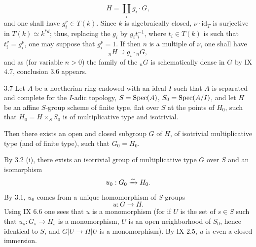 \[
H=\coprod_i g_i\cdot G,
\]
and one shall have $g_i^\nu\in T(k)$. Since $k$ is algebraically closed, $\nu\cdot\mathrm{id}_T$ is surjective in $T(k)\simeq k^{*d}$; thus, replacing the $g_i$ by $g_it_i^{-1}$, where $t_i\in T(k)$ is such that $t_i^\nu=g_i^\nu$, one may suppose that $g_i^\nu=1$. If then $n$ is a multiple of $\nu$, one shall have
\[
{}_nH\supseteq g_i\cdot{}_nG,
\]
and as (for variable $n>0$) the family of the ${}_nG$ is schematically dense in $G$ by IX 4.7, conclusion 3.6 appears.
\begin{theorem}{3.7}\label{X.3.7}
Let $A$ be a noetherian ring endowed with an ideal $I$ such that $A$ is separated and complete for the $I$-adic topology, $S=\operatorname{Spec}(A)$, $S_0=\operatorname{Spec}(A/I)$, and let $H$ be an affine $S$-group scheme of finite type, flat over $S$ at the points of $H_0$, such that $H_0=H\times_S S_0$ is of multiplicative type and isotrivial.

Then there exists an open and closed subgroup $G$ of $H$, of isotrivial multiplicative type (and of finite type), such that $G_0=H_0$.
\end{theorem}
By 3.2 (i), there exists an isotrivial group of multiplicative type $G$ over $S$ and an isomorphism
\[
u_0:G_0\xrightarrow{\sim} H_0.
\]
By 3.1, $u_0$ comes from a unique homomorphism of $S$-groups
\[
u:G\to H.
\]
Using IX 6.6 one sees that $u$ is a monomorphism (for if $U$ is the set of $s\in S$ such that $u_s:G_s\to H_s$ is a monomorphism, $U$ is an open neighborhood of $S_0$, hence identical to $S$, and $G|U\to H|U$ is a monomorphism). By IX 2.5, $u$ is even a closed immersion.

